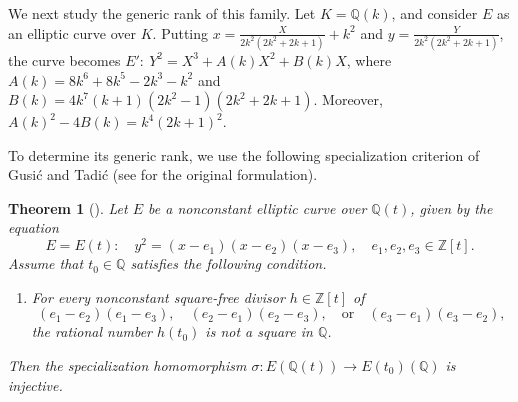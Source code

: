 \documentclass{article}
\theoremstyle{plain}
\newtheorem{theorem}{Theorem}
\newcommand{\Q}{\mathbb{Q}}
\begin{document}
We next study the generic rank of this family.
Let \(K=\Q(k)\), and consider \(E\) as an elliptic curve over \(K\).
Putting
\(x=\frac{X}{2k^2(2k^2+2k+1)}+k^2\) and
\(y=\frac{Y}{2k^2(2k^2+2k+1)}\), the curve becomes
\(E':\ Y^2=X^3+A(k)X^2+B(k)X\), where
\(A(k)=8k^6+8k^5-2k^3-k^2\) and
\(B(k)=4k^7(k+1)(2k^2-1)(2k^2+2k+1)\). Moreover,
\(A(k)^2-4B(k)=k^4(2k+1)^2\).

To determine its generic rank, we use the following specialization criterion of Gusić and Tadić \cite{GusicTadic} (see \cite[Theorem 3.1]{GusicTadicGlasnik} for the original formulation).

\begin{theorem}[{\cite[Theorem 1.1]{GusicTadic}}]\label{thm:GusicTadic}
Let \(E\) be a nonconstant elliptic curve over \(\mathbb{Q}(t)\), given by the equation
\[
E=E(t):\quad y^2=(x-e_1)(x-e_2)(x-e_3),
\quad e_1,e_2,e_3\in \mathbb{Z}[t].
\]
Assume that \(t_0\in\mathbb{Q}\) satisfies the following condition.

\begin{enumerate}
\item[\textnormal{(GT)}] For every nonconstant square-free divisor \(h\in\mathbb{Z}[t]\) of
\[
(e_1-e_2)(e_1-e_3),\quad
(e_2-e_1)(e_2-e_3),\quad
\text{or}\quad
(e_3-e_1)(e_3-e_2),
\]
the rational number \(h(t_0)\) is not a square in \(\mathbb{Q}\).
\end{enumerate}

\noindent Then the specialization homomorphism
\( \sigma:E(\mathbb{Q}(t))\longrightarrow E(t_0)(\mathbb{Q}) \)
is injective.
\end{theorem}
\end{document}
